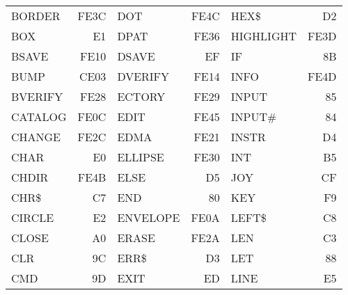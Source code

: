 {\begin{center}
\begin{tabular}{|p{2.2cm}r|p{2.2cm}r|p{2.2cm}r|}
BORDER     & FE3C &DOT        & FE4C &HEX\$      &   D2 \\
BOX        &   E1 &DPAT       & FE36 &HIGHLIGHT  & FE3D \\
BSAVE      & FE10 &DSAVE      &   EF &IF         &   8B \\
BUMP       & CE03 &DVERIFY    & FE14 &INFO       & FE4D \\
BVERIFY    & FE28 &ECTORY     & FE29 &INPUT      &   85 \\
CATALOG    & FE0C &EDIT       & FE45 &INPUT\#    &   84 \\
CHANGE     & FE2C &EDMA       & FE21 &INSTR      &   D4 \\
CHAR       &   E0 &ELLIPSE    & FE30 &INT        &   B5 \\
CHDIR      & FE4B &ELSE       &   D5 &JOY        &   CF \\
CHR\$      &   C7 &END        &   80 &KEY        &   F9 \\
CIRCLE     &   E2 &ENVELOPE   & FE0A &LEFT\$     &   C8 \\
CLOSE      &   A0 &ERASE      & FE2A &LEN        &   C3 \\
CLR        &   9C &ERR\$      &   D3 &LET        &   88 \\
CMD        &   9D &EXIT       &   ED &LINE       &   E5 \\
\hline
\end{tabular}
\end{center}
}
\newpage
